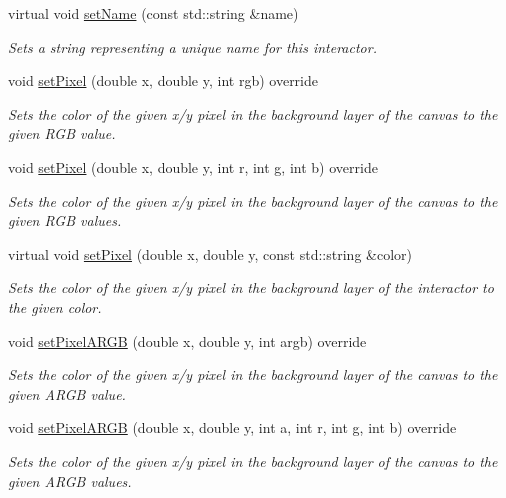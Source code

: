 \begin{DoxyCompactItemize}
virtual void \mbox{\hyperlink{classsgl_1_1GInteractor_a9d3a2685df23b5e7cbf59c19c4a1f9b5}{set\+Name}} (const std\+::string \&name)
\begin{DoxyCompactList}\small\item\em Sets a string representing a unique name for this interactor. \end{DoxyCompactList}\item 
void \mbox{\hyperlink{classsgl_1_1GCanvas_a05b3441e912e4c0ed45e9ed43bb745d1}{set\+Pixel}} (double x, double y, int rgb) override
\begin{DoxyCompactList}\small\item\em Sets the color of the given x/y pixel in the background layer of the canvas to the given R\+GB value. \end{DoxyCompactList}\item 
void \mbox{\hyperlink{classsgl_1_1GCanvas_a92c3e3ef930ae7742ad384af28aac241}{set\+Pixel}} (double x, double y, int r, int g, int b) override
\begin{DoxyCompactList}\small\item\em Sets the color of the given x/y pixel in the background layer of the canvas to the given R\+GB values. \end{DoxyCompactList}\item 
virtual void \mbox{\hyperlink{classsgl_1_1GDrawingSurface_a09f9640e4ff7388dcfc391efd88d2415}{set\+Pixel}} (double x, double y, const std\+::string \&color)
\begin{DoxyCompactList}\small\item\em Sets the color of the given x/y pixel in the background layer of the interactor to the given color. \end{DoxyCompactList}\item 
void \mbox{\hyperlink{classsgl_1_1GCanvas_ae189342d4b4235efa2ece08e08758499}{set\+Pixel\+A\+R\+GB}} (double x, double y, int argb) override
\begin{DoxyCompactList}\small\item\em Sets the color of the given x/y pixel in the background layer of the canvas to the given A\+R\+GB value. \end{DoxyCompactList}\item 
void \mbox{\hyperlink{classsgl_1_1GCanvas_a2d22778c4fdce45bb2df60518000c5ad}{set\+Pixel\+A\+R\+GB}} (double x, double y, int a, int r, int g, int b) override
\begin{DoxyCompactList}\small\item\em Sets the color of the given x/y pixel in the background layer of the canvas to the given A\+R\+GB values. \end{DoxyCompactList}\item 

\end{DoxyCompactItemize}
